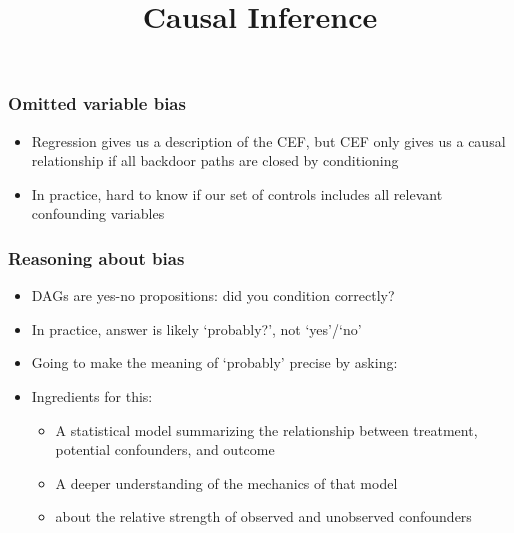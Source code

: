 \documentclass[11pt,xcolor={dvipsnames},usepdftitle=false]{beamer}
\begin{document}
\title{Causal Inference}

\frame{\titlepage}

\begin{frame}
\frametitle{Omitted variable bias}
\begin{itemize}
\item Regression gives us a description of the CEF, but CEF only gives us a causal relationship if all backdoor paths are closed by conditioning
\item In practice, hard to know if our set of controls includes all relevant confounding variables
\end{itemize}

\begin{center}
\end{center}
\end{frame}

\begin{frame}
\frametitle{Reasoning about bias}
\begin{itemize}
\item DAGs are yes-no propositions: did you condition correctly?
\item In practice, answer is likely `probably?', not `yes'/`no'
\item Going to make the meaning of `probably' precise by asking: 
\item Ingredients for this:
\begin{itemize}
    \item A statistical model summarizing the relationship between treatment, potential confounders, and outcome
    \item A deeper understanding of the mechanics of that model
    \item {} about the relative strength of observed and unobserved confounders
\end{itemize}
\end{itemize}
\end{frame}
\end{document}

